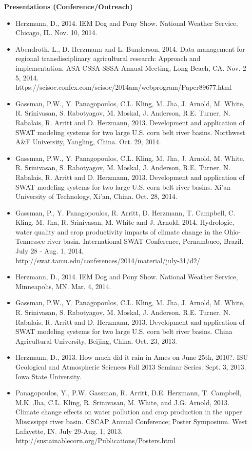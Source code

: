\normalsize \sf
\normalsize \bf Presentations (Conference/Outreach)
\normalsize \sf
\begin{itemize}
\item Herzmann, D., 2014. IEM Dog and Pony Show. National Weather Service, Chicago, IL. Nov. 10, 2014.
\item Abendroth, L., D. Herzmann and L. Bunderson, 2014. Data management for regional transdisciplinary agricultural research: Approach and implementation. ASA-CSSA-SSSA Annual Meeting, Long Beach, CA. Nov. 2-5, 2014. https://scisoc.confex.com/scisoc/2014am/webprogram/Paper89677.html
\item Gassman, P.W., Y. Panagopoulos, C.L. Kling, M. Jha, J. Arnold, M. White, R. Srinivasan, S. Rabotyagov, M. Moskal, J. Anderson, R.E. Turner, N. Rabalais, R. Arritt and D. Herzmann, 2013. Development and application of SWAT modeling systems for two large U.S. corn belt river basins. Northwest A\&F University, Yangling, China. Oct. 29, 2014. 
\item Gassman, P.W., Y. Panagopoulos, C.L. Kling, M. Jha, J. Arnold, M. White, R. Srinivasan, S. Rabotyagov, M. Moskal, J. Anderson, R.E. Turner, N. Rabalais, R. Arritt and D. Herzmann, 2013. Development and application of SWAT modeling systems for two large U.S. corn belt river basins. Xi'an University of Technology, Xi'an, China. Oct. 28, 2014. 
\item Gassman, P., Y. Panagopoulos, R. Arritt, D. Herzmann, T. Campbell, C. Kling, M. Jha, R. Srinivasan, M. White and J. Arnold, 2014. Hydrologic, water quality and crop productivity impacts of climate change in the Ohio-Tennessee river basin. International SWAT Conference, Pernambuco, Brazil. July 28 - Aug. 1, 2014. http://swat.tamu.edu/conferences/2014/material/july-31/d2/
\item Herzmann, D., 2014. IEM Dog and Pony Show. National Weather Service, Minneapolis, MN. Mar. 4, 2014.
\item Gassman, P.W., Y. Panagopoulos, C.L. Kling, M. Jha, J. Arnold, M. White, R. Srinivasan, S. Rabotyagov, M. Moskal, J. Anderson, R.E. Turner, N. Rabalais, R. Arritt and D. Herzmann, 2013. Development and application of SWAT modeling systems for two large U.S. corn belt river basins. China Agricultural University, Beijing, China. Oct. 23, 2013. 
\item Herzmann, D., 2013. How much did it rain in Ames on June 25th, 2010?. ISU Geological and Atmospheric Sciences Fall 2013 Seminar Series. Sept. 3, 2013. Iowa State University. 
\item Panagopoulos, Y., P.W. Gassman, R. Arritt, D.E. Herzmann, T. Campbell, M.K. Jha, C.L. Kling, R. Srinivasan, M. White, and J.G. Arnold, 2013. Climate change effects on water pollution and crop production in the upper Mississippi river basin. CSCAP Annual Conference; Poster Symposium. West Lafayette, IN. July 29-Aug. 1, 2013. http://sustainablecorn.org/Publications/Posters.html

\end{itemize}
